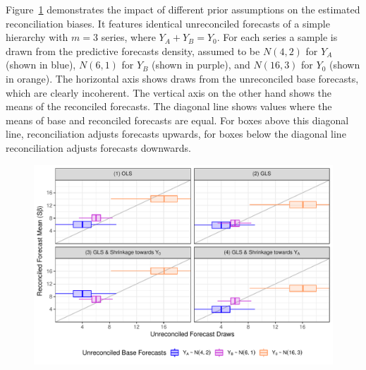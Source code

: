 \documentclass[a4paper,fleqn,11pt]{article}
\begin{document}
Figure~\ref{fig:weights} demonstrates the impact of different prior assumptions on the estimated reconciliation biases. It features identical unreconciled forecasts of a simple hierarchy with $m=3$ series, where $Y_A + Y_B = Y_0$. For each series a sample is drawn from the predictive forecasts density, assumed to be $N(4,2)$ for $Y_A$ (shown in blue), $N(6,1)$ for $Y_B$ (shown in purple), and $N(16,3)$ for $Y_0$ (shown in orange). The horizontal axis shows draws from the unreconciled base forecasts, which are clearly incoherent. The vertical axis on the other hand shows the means of the reconciled forecasts. The diagonal line shows values where the means of base and reconciled forecasts are equal. For boxes above this diagonal line, reconciliation adjusts forecasts upwards, for boxes below the diagonal line reconciliation adjusts forecasts downwards.
\begin{figure}[H]
	\includegraphics[width=\textwidth]{fig/fig_biases}
	\label{fig:weights}
\end{figure}
\end{document}
